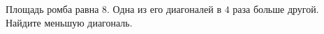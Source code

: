 \begin{ex}
	\begin{condition}
		Площадь ромба равна \(8\). Одна из его диагоналей в \(4\) раза больше другой. Найдите меньшую диагональ.
	\end{condition}
\end{ex}